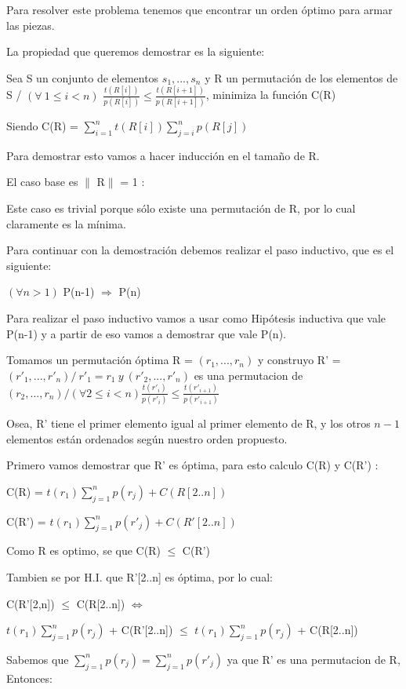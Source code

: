 Para resolver este problema tenemos que encontrar un orden óptimo para armar las piezas.

La propiedad que queremos demostrar es la siguiente:

Sea S un conjunto de elementos  ${s_1,...,s_n}$ y R un permutación de los elementos de S / $(\forall \ 1 \leq i  < n)$ $\frac{t(R[i])}{p(R[i])} \leq \frac{t(R[i+1])}{p(R[i+1])} $, minimiza la función C(R) 

Siendo C(R) = $\sum_{i=1}^{n} t(R[i]) \sum_{j=i}^{n}p(R[j]) $

Para demostrar esto vamos a hacer inducción en el tamaño de R.

El caso base  es $\|$ R$\|$ = 1 :

Este caso es trivial porque sólo existe una permutación de R, por lo cual claramente es la mínima.

Para continuar con la demostración debemos realizar el paso inductivo, que es el siguiente:

$(\forall n > 1)$  P(n-1) $\Rightarrow$ P(n)

Para realizar el paso inductivo vamos a usar como Hipótesis inductiva que vale P(n-1) y a partir de eso vamos a demostrar que vale P(n).

Tomamos un permutación óptima R = $(r_1,...,r_n)$ y construyo R' = $(r'_1,...,r'_n) / \  r'_1 = r_1 \  y \ (r'_2,...,r'_n)$ es una permutacion de $(r_2,...,r_n) / (\forall 2 \leq i  < n) \frac{t(r'_i)}{p(r'_i)} \leq \frac{t(r'_{i+1})}{p(r'_{i+1})} $

Osea, R' tiene el primer elemento igual al primer elemento de R, y los otros $n-1$ elementos están ordenados según nuestro orden propuesto.

Primero vamos demostrar que R' es óptima, para esto calculo C(R) y C(R') :

C(R) = $t(r_1) \sum_{j=1}^{n}p(r_j) + C(R[2..n]) $

C(R') = $t(r_1) \sum_{j=1}^{n}p(r'_j) + C(R'[2..n]) $

Como R es optimo, se que C(R) $\leq$ C(R')

Tambien se por H.I. que R'[2..n] es óptima, por lo cual: 

C(R'[2,n]) $\leq$ C(R[2..n]) $\iff$

$t(r_1) \sum_{j=1}^{n}p(r_j)$ + C(R'[2..n]) $\leq$  $t(r_1) \sum_{j=1}^{n}p(r_j)$ + C(R[2..n])

Sabemos que $\sum_{j=1}^{n}p(r_j) = \sum_{j=1}^{n}p(r'_j)$ ya que R' es una permutacion de R, Entonces:

